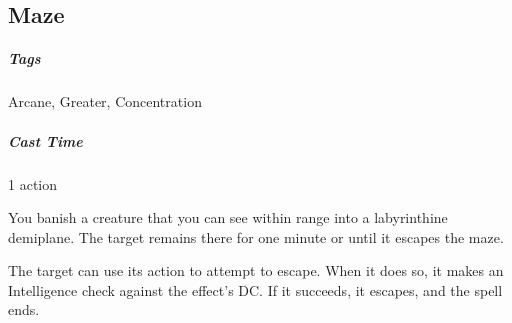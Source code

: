 







\subsection{Maze}\label{spell:maze}
\subparagraph*{Tags} Arcane, Greater, Concentration
\subparagraph*{Cast Time} 1 action

You banish a creature that you can see within range into a labyrinthine demiplane. The target remains there for one minute or until it escapes the maze.

The target can use its action to attempt to escape. When it does so, it makes an Intelligence check against the effect's DC. If it succeeds, it escapes, and the spell ends.

